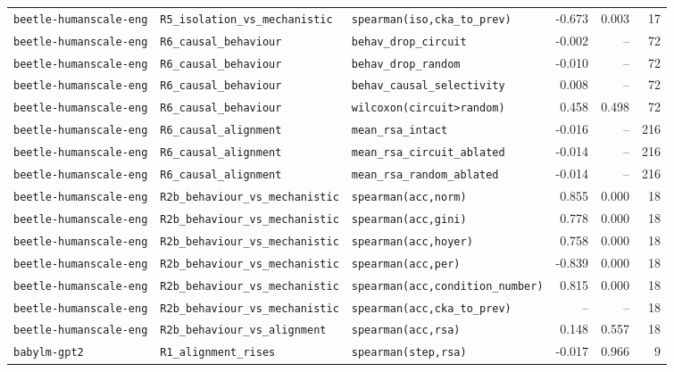 \begin{longtable}{lllrrr}
\texttt{beetle-humanscale-eng} & \texttt{R5\_isolation\_vs\_mechanistic} & \texttt{spearman(iso,cka\_to\_prev)} & -0.673 & 0.003 & 17 \\
\texttt{beetle-humanscale-eng} & \texttt{R6\_causal\_behaviour} & \texttt{behav\_drop\_circuit} & -0.002 & -- & 72 \\
\texttt{beetle-humanscale-eng} & \texttt{R6\_causal\_behaviour} & \texttt{behav\_drop\_random} & -0.010 & -- & 72 \\
\texttt{beetle-humanscale-eng} & \texttt{R6\_causal\_behaviour} & \texttt{behav\_causal\_selectivity} & 0.008 & -- & 72 \\
\texttt{beetle-humanscale-eng} & \texttt{R6\_causal\_behaviour} & \texttt{wilcoxon(circuit>random)} & 0.458 & 0.498 & 72 \\
\texttt{beetle-humanscale-eng} & \texttt{R6\_causal\_alignment} & \texttt{mean\_rsa\_intact} & -0.016 & -- & 216 \\
\texttt{beetle-humanscale-eng} & \texttt{R6\_causal\_alignment} & \texttt{mean\_rsa\_circuit\_ablated} & -0.014 & -- & 216 \\
\texttt{beetle-humanscale-eng} & \texttt{R6\_causal\_alignment} & \texttt{mean\_rsa\_random\_ablated} & -0.014 & -- & 216 \\
\texttt{beetle-humanscale-eng} & \texttt{R2b\_behaviour\_vs\_mechanistic} & \texttt{spearman(acc,norm)} & 0.855 & 0.000 & 18 \\
\texttt{beetle-humanscale-eng} & \texttt{R2b\_behaviour\_vs\_mechanistic} & \texttt{spearman(acc,gini)} & 0.778 & 0.000 & 18 \\
\texttt{beetle-humanscale-eng} & \texttt{R2b\_behaviour\_vs\_mechanistic} & \texttt{spearman(acc,hoyer)} & 0.758 & 0.000 & 18 \\
\texttt{beetle-humanscale-eng} & \texttt{R2b\_behaviour\_vs\_mechanistic} & \texttt{spearman(acc,per)} & -0.839 & 0.000 & 18 \\
\texttt{beetle-humanscale-eng} & \texttt{R2b\_behaviour\_vs\_mechanistic} & \texttt{spearman(acc,condition\_number)} & 0.815 & 0.000 & 18 \\
\texttt{beetle-humanscale-eng} & \texttt{R2b\_behaviour\_vs\_mechanistic} & \texttt{spearman(acc,cka\_to\_prev)} & -- & -- & 18 \\
\texttt{beetle-humanscale-eng} & \texttt{R2b\_behaviour\_vs\_alignment} & \texttt{spearman(acc,rsa)} & 0.148 & 0.557 & 18 \\
\texttt{babylm-gpt2} & \texttt{R1\_alignment\_rises} & \texttt{spearman(step,rsa)} & -0.017 & 0.966 & 9 \\

\end{longtable}
